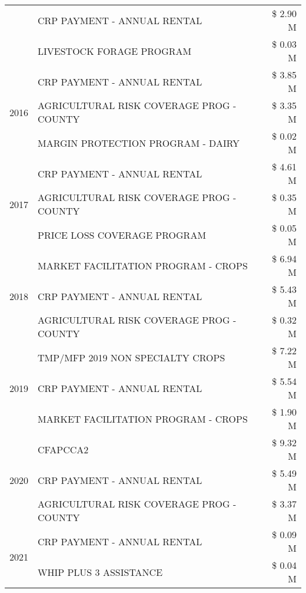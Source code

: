 \begin{tabular}{llr}
 & CRP PAYMENT - ANNUAL RENTAL & \$ 2.90 M \\
 & LIVESTOCK FORAGE PROGRAM & \$ 0.03 M \\
\cline{1-3}
\multirow[t]{3}{*}{2016} & CRP PAYMENT - ANNUAL RENTAL & \$ 3.85 M \\
 & AGRICULTURAL RISK COVERAGE PROG - COUNTY & \$ 3.35 M \\
 & MARGIN PROTECTION PROGRAM - DAIRY & \$ 0.02 M \\
\cline{1-3}
\multirow[t]{3}{*}{2017} & CRP PAYMENT - ANNUAL RENTAL & \$ 4.61 M \\
 & AGRICULTURAL RISK COVERAGE PROG - COUNTY & \$ 0.35 M \\
 & PRICE LOSS COVERAGE PROGRAM & \$ 0.05 M \\
\cline{1-3}
\multirow[t]{3}{*}{2018} & MARKET FACILITATION PROGRAM - CROPS & \$ 6.94 M \\
 & CRP PAYMENT - ANNUAL RENTAL & \$ 5.43 M \\
 & AGRICULTURAL RISK COVERAGE PROG - COUNTY & \$ 0.32 M \\
\cline{1-3}
\multirow[t]{3}{*}{2019} & TMP/MFP 2019 NON SPECIALTY CROPS & \$ 7.22 M \\
 & CRP PAYMENT - ANNUAL RENTAL & \$ 5.54 M \\
 & MARKET FACILITATION PROGRAM - CROPS & \$ 1.90 M \\
\cline{1-3}
\multirow[t]{3}{*}{2020} & CFAPCCA2 & \$ 9.32 M \\
 & CRP PAYMENT - ANNUAL RENTAL & \$ 5.49 M \\
 & AGRICULTURAL RISK COVERAGE PROG - COUNTY & \$ 3.37 M \\
\cline{1-3}
\multirow[t]{2}{*}{2021} & CRP PAYMENT - ANNUAL RENTAL & \$ 0.09 M \\
 & WHIP PLUS 3 ASSISTANCE & \$ 0.04 M \\
\cline{1-3}
\bottomrule
\end{tabular}
